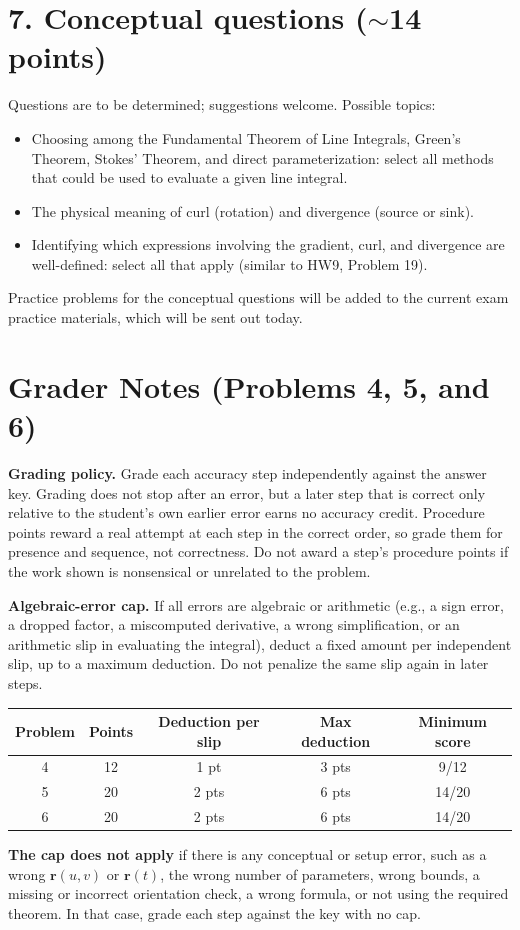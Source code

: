 \documentclass[11pt,letterpaper]{article}
\renewcommand{\vec}[1]{\mathbf{#1}}
\begin{document}
\section*{7. Conceptual questions ($\sim$14 points)}
Questions are to be determined; suggestions welcome. Possible topics:
\begin{itemize}
  \item Choosing among the Fundamental Theorem of Line Integrals, Green's Theorem, Stokes' Theorem, and direct parameterization: select all methods that could be used to evaluate a given line integral.
  \item The physical meaning of curl (rotation) and divergence (source or sink).
  \item Identifying which expressions involving the gradient, curl, and divergence are well-defined: select all that apply (similar to HW9, Problem 19).
\end{itemize}
Practice problems for the conceptual questions will be added to the current exam practice materials, which will be sent out today.
 
\clearpage
\section*{Grader Notes (Problems 4, 5, and 6)}
 
\textbf{Grading policy.} Grade each accuracy step independently against the answer key. Grading does not stop after an error, but a later step that is correct only relative to the student's own earlier error earns no accuracy credit. Procedure points reward a real attempt at each step in the correct order, so grade them for presence and sequence, not correctness. Do not award a step's procedure points if the work shown is nonsensical or unrelated to the problem.
 
\textbf{Algebraic-error cap.} If all errors are algebraic or arithmetic (e.g., a sign error, a dropped factor, a miscomputed derivative, a wrong simplification, or an arithmetic slip in evaluating the integral), deduct a fixed amount per independent slip, up to a maximum deduction. Do not penalize the same slip again in later steps.
 
\begin{center}
\renewcommand{\arraystretch}{1.3}
\begin{tabular}{|c|c|c|c|c|}
\hline
\textbf{Problem} & \textbf{Points} & \textbf{Deduction per slip} & \textbf{Max deduction} & \textbf{Minimum score}\\
\hline
4 & 12 & 1 pt & 3 pts & 9/12\\
5 & 20 & 2 pts & 6 pts & 14/20\\
6 & 20 & 2 pts & 6 pts & 14/20\\
\hline
\end{tabular}
\end{center}
 
\textbf{The cap does not apply} if there is any conceptual or setup error, such as a wrong $\vec r(u,v)$ or $\vec r(t)$, the wrong number of parameters, wrong bounds, a missing or incorrect orientation check, a wrong formula, or not using the required theorem. In that case, grade each step against the key with no cap.
 
\end{document}
